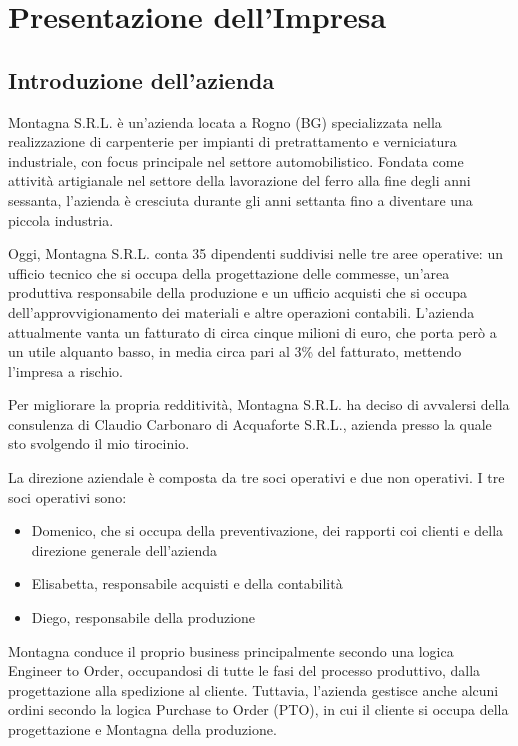 \chapter{Presentazione dell'Impresa}

\section{Introduzione dell'azienda}
\begin{multicols}{2}
	Montagna S.R.L. è un’azienda locata a Rogno (BG) specializzata nella realizzazione di carpenterie per impianti di pretrattamento e verniciatura industriale, con focus principale nel settore automobilistico. Fondata come attività artigianale nel settore della lavorazione del ferro alla fine degli anni sessanta, l'azienda è cresciuta durante gli anni settanta fino a diventare una piccola industria.

	Oggi, Montagna S.R.L. conta 35 dipendenti suddivisi nelle tre aree operative: un ufficio tecnico che si occupa della progettazione delle commesse, un’area produttiva responsabile della produzione e un ufficio acquisti che si occupa dell’approvvigionamento dei materiali e altre operazioni contabili. L’azienda attualmente vanta un fatturato di circa cinque milioni di euro, che porta però a un utile alquanto basso, in media circa pari al 3\% del fatturato, mettendo l'impresa a rischio.

	Per migliorare la propria redditività, Montagna S.R.L. ha deciso di avvalersi della consulenza di Claudio Carbonaro di Acquaforte S.R.L., azienda presso la quale sto svolgendo il mio tirocinio.

	La direzione aziendale è composta da tre soci operativi e due non operativi. I tre soci operativi sono:
	\begin{itemize}
		\item Domenico, che si occupa della preventivazione, dei rapporti coi clienti e della direzione generale dell'azienda
		\item Elisabetta, responsabile acquisti e della contabilità
		\item Diego, responsabile della produzione
	\end{itemize}

	Montagna conduce il proprio business principalmente secondo una logica Engineer to Order, occupandosi di tutte le fasi del processo produttivo, dalla progettazione alla spedizione al cliente. Tuttavia, l'azienda gestisce anche alcuni ordini secondo la logica Purchase to Order (PTO), in cui il cliente si occupa della progettazione e Montagna della produzione.
\end{multicols}

